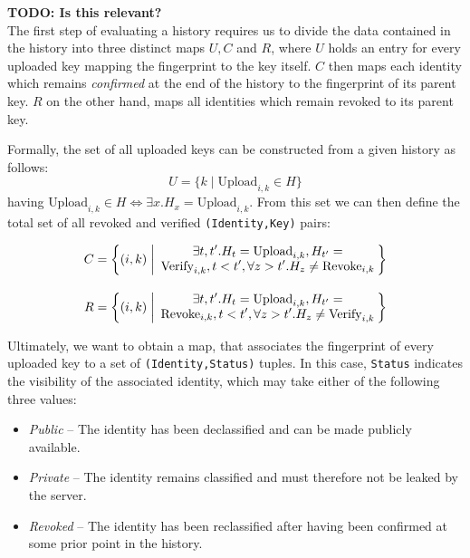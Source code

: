 \textbf{TODO: Is this relevant?} \\
The first step of evaluating a history requires us to divide the data contained in the history into three distinct maps \(U,C\) and \(R\), where \(U\) holds an entry for every uploaded key mapping the fingerprint to the key itself. \(C\) then maps each identity which remains \emph{confirmed} at the end of the history to the fingerprint of its parent key. \(R\) on the other hand, maps all identities which remain revoked to its parent key.

Formally, the set of all uploaded keys can be constructed from a given history as follows:
\newcommand{\pctext}[2]{\text{\parbox{#1}{\centering #2}}}
\[U = \biggl \{k \;\bigg|\; \text{Upload}_{i,k} \in H \biggr\}\]
having \(\text{Upload}_{i,k} \in H \Leftrightarrow \exists x. H_x = \text{Upload}_{i,k}\). 
From this set we can then define the total set of all revoked and verified \texttt{(Identity,Key)} pairs:

\begin{equation}
    \begin{alignedat}{2}
        C &= \biggl \{(i,k) &&\;\bigg|\; \pctext{2.4in}{\(\exists t,t'. H_t = \text{Upload}_{i,k},H_{t'} = \text{Verify}_{i,k}, t < t', \forall z > t'. H_z \neq \text{Revoke}_{i,k}\)}  \biggr \} \\[10pt]
        R &= \biggl \{(i,k) &&\;\bigg|\; \pctext{2.4in}{\(\exists t,t'. H_t = \text{Upload}_{i,k},H_{t'} = \text{Revoke}_{i,k}, t < t', \forall z > t'. H_z \neq \text{Verify}_{i,k}\)}  \biggr \}
    \end{alignedat}
\end{equation}

Ultimately, we want to obtain a map, that associates the fingerprint of every uploaded key to a set of \texttt{(Identity,Status)} tuples. In this case, \texttt{Status} indicates the visibility of the associated identity, which may take either of the following three values: 
\begin{itemize}
    \item \emph{Public} -- The identity has been declassified and can be made publicly available.
    \item \emph{Private} -- The identity remains classified and must therefore not be leaked by the server.
    \item \emph{Revoked} -- The identity has been reclassified after having been confirmed at some prior point in the history.
\end{itemize}


